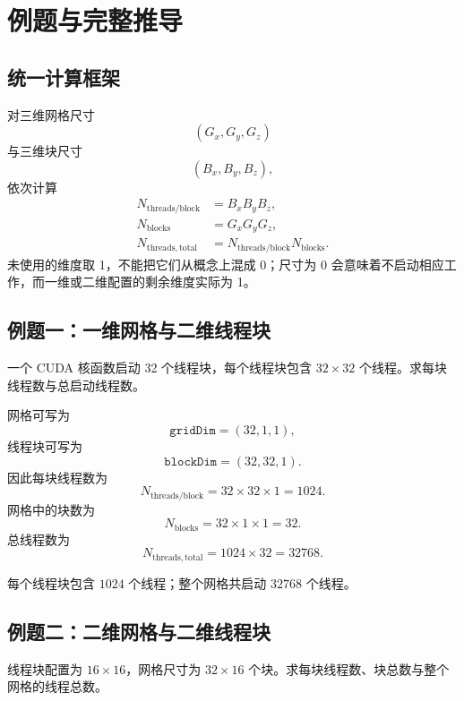 \section{例题与完整推导}

\subsection{统一计算框架}

对三维网格尺寸
\[
(G_x,G_y,G_z)
\]
与三维块尺寸
\[
(B_x,B_y,B_z),
\]
依次计算
\[
\begin{aligned}
N_{\mathrm{threads/block}} &= B_xB_yB_z,\\
N_{\mathrm{blocks}} &= G_xG_yG_z,\\
N_{\mathrm{threads,total}} &=
N_{\mathrm{threads/block}}N_{\mathrm{blocks}}.
\end{aligned}
\]
未使用的维度取 1，不能把它们从概念上混成 0；尺寸为 0 会意味着不启动相应工作，而一维或二维配置的剩余维度实际为 1。

\subsection{例题一：一维网格与二维线程块}

\begin{examplebox}[title=题目]
一个 CUDA 核函数启动 32 个线程块，每个线程块包含 $32\times32$ 个线程。求每块线程数与总启动线程数。
\end{examplebox}

网格可写为
\[
\texttt{gridDim}=(32,1,1),
\]
线程块可写为
\[
\texttt{blockDim}=(32,32,1).
\]
因此每块线程数为
\[
N_{\mathrm{threads/block}}
=32\times32\times1
=1024.
\]
网格中的块数为
\[
N_{\mathrm{blocks}}
=32\times1\times1
=32.
\]
总线程数为
\[
N_{\mathrm{threads,total}}
=1024\times32
=32768.
\]

\begin{keybox}[title=答案]
每个线程块包含 $1024$ 个线程；整个网格共启动 $32768$ 个线程。
\end{keybox}

\subsection{例题二：二维网格与二维线程块}

\begin{examplebox}[title=题目]
线程块配置为 $16\times16$，网格尺寸为 $32\times16$ 个块。求每块线程数、块总数与整个网格的线程总数。
\end{examplebox}

